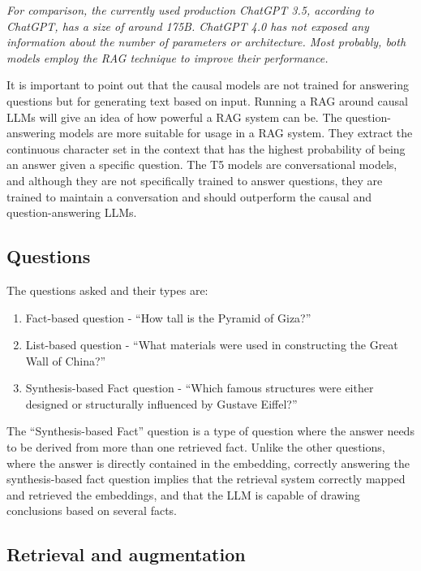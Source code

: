 \documentclass[11pt]{wseas}
\begin{document}
\emph{For comparison, the currently used production ChatGPT 3.5,
according to ChatGPT, has a size of around 175B. ChatGPT 4.0 has not
exposed any information about the number of parameters or architecture.
Most probably, both models employ the RAG technique to improve their
performance.}

It is important to point out that the causal models are not trained for
answering questions but for generating text based on input. Running a
RAG around causal LLMs will give an idea of how powerful a RAG system
can be. The question-answering models are more suitable for usage in a
RAG system. They extract the continuous character set in the context
that has the highest probability of being an answer given a specific
question. The T5 models are conversational models, and although they are
not specifically trained to answer questions, they are trained to
maintain a conversation and should outperform the causal and
question-answering LLMs.

\subsection{Questions}\label{questions}

The questions asked and their types are:

\begin{enumerate}
\def\labelenumi{\arabic{enumi}.}
\item
  Fact-based question - ``How tall is the Pyramid of Giza?''
\item
  List-based question - ``What materials were used in constructing the
  Great Wall of China?''
\item
  Synthesis-based Fact question - ``Which famous structures were either
  designed or structurally influenced by Gustave Eiffel?''
\end{enumerate}

The ``Synthesis-based Fact'' question is a type of question where the
answer needs to be derived from more than one retrieved fact. Unlike the
other questions, where the answer is directly contained in the
embedding, correctly answering the synthesis-based fact question implies
that the retrieval system correctly mapped and retrieved the embeddings,
and that the LLM is capable of drawing conclusions based on several
facts.

\newpage

\subsection{Retrieval and
augmentation}\label{retrieval-and-augmentation}
\end{document}
